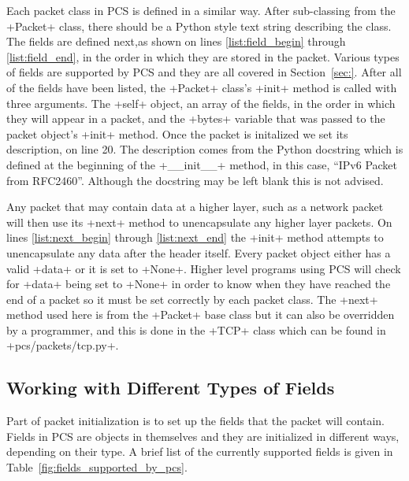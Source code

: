 \documentclass[11pt]{article}
\begin{document}
Each packet class in PCS is defined in a similar way.  After
sub-classing from the \class+Packet+ class, there should be a Python
style text string describing the class.  The fields are defined
next,as shown on lines \ref{list:field_begin} through
\ref{list:field_end}, in the order in which they are stored in the
packet.  Various types of fields are supported by PCS and they are all
covered in Section~\ref{sec:}.  After all of the fields have been
listed, the \class+Packet+ class's \method+init+ method is called with
three arguments.  The \class+self+ object, an array of the fields, in
the order in which they will appear in a packet, and the \field+bytes+
variable that was passed to the packet object's \method+init+ method.
Once the packet is initalized we set its description, on line 20.
The description comes from the Python docstring which is defined at
the beginning of the \method+__init__+ method, in this case, ``IPv6
Packet from RFC2460''.  Although the docstring may be left blank this
is not advised.

Any packet that may contain data at a higher layer, such as a network
packet will then use its \method+next+ method to unencapsulate any
higher layer packets.  On lines \ref{list:next_begin} through
\ref{list:next_end} the \method+init+ method attempts to unencapsulate
any data after the header itself.  Every packet object either has a
valid \field+data+ or it is set to \constant+None+.  Higher level
programs using PCS will check for \field+data+ being set to
\variable+None+ in order to know when they have reached the end of a
packet so it must be set correctly by each packet class.  The
\method+next+ method used here is from the \class+Packet+ base class
but it can also be overridden by a programmer, and this is done in the
\class+TCP+ class which can be found in \file+pcs/packets/tcp.py+.

\subsection{Working with Different Types of Fields}
\label{sec:working_with_different_types_of_fields}

Part of packet initialization is to set up the fields that the packet
will contain.  Fields in PCS are objects in themselves and they are
initialized in different ways, depending on their type.  A brief list
of the currently supported fields is given in
Table~\ref{fig:fields_supported_by_pcs}.
\end{document}
